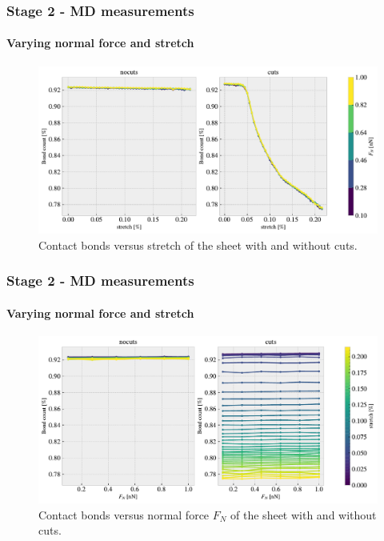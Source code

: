 \documentclass[
	10pt, %
]{beamer}
\begin{document}
\begin{frame}
	\frametitle{Stage 2 - MD measurements}
	\framesubtitle{Varying normal force and stretch}
	\begin{figure}
		\includegraphics[width=\linewidth]{figures/multi_lowFN3.pdf}
		\caption{Contact bonds versus stretch of the sheet with and without cuts.}
	\end{figure}	
\end{frame}

\begin{frame}
	\frametitle{Stage 2 - MD measurements}
	\framesubtitle{Varying normal force and stretch}
	\begin{figure}
		\includegraphics[width=\linewidth]{figures/multi_lowFN4.pdf}
		\caption{Contact bonds versus normal force $F_N$ of the sheet with and without cuts.}
	\end{figure}	
\end{frame}
\end{document}
